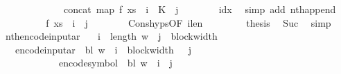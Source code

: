 \begin{isabellebody}
\ \ \ \ \ \ \ \ \ \ \ \ {\isacharequal}{\kern0pt}\ concat\ {\isacharparenleft}{\kern0pt}map\ f\ xs{\isacharparenright}{\kern0pt}\ {\isacharbang}{\kern0pt}\ {\isacharparenleft}{\kern0pt}i{\isacharprime}{\kern0pt}\ {\isacharasterisk}{\kern0pt}\ K\ {\isacharplus}{\kern0pt}\ j{\isacharparenright}{\kern0pt}{\isachardoublequoteclose}\isanewline
\ \ \ \ \ \ \isamarkupfalse%
\ idx\ \isamarkupfalse%
\ {\isacharparenleft}{\kern0pt}simp\ add{\isacharcolon}{\kern0pt}\ nth{\isacharunderscore}{\kern0pt}append{\isacharparenright}{\kern0pt}\isanewline
\ \ \ \ \isamarkupfalse%
\ \isamarkupfalse%
\ {\isachardoublequoteopen}{\isasymdots}\ {\isacharequal}{\kern0pt}\ f\ {\isacharparenleft}{\kern0pt}xs\ {\isacharbang}{\kern0pt}\ i{\isacharprime}{\kern0pt}{\isacharparenright}{\kern0pt}\ {\isacharbang}{\kern0pt}\ j{\isachardoublequoteclose}\isanewline
\ \ \ \ \ \ \isamarkupfalse%
\ Cons{\isachardot}{\kern0pt}hyps{\isacharbrackleft}{\kern0pt}OF\ i{\isacharprime}{\kern0pt}len{\isacharbrackright}{\kern0pt}\ \isakeywordONE{{\isachardot}{\kern0pt}}\isamarkupfalse%
\isanewline
\ \ \ \ \isamarkupfalse%
\ \isamarkupfalse%
\ {\isacharquery}{\kern0pt}thesis\ \isamarkupfalse%
\ Suc\ \isamarkupfalse%
\ simp\isanewline
\ \ \isamarkupfalse%
\isanewline
{}\isamarkupfalse%
%
\endisatagproof
{\isafoldproof}%
%
\isadelimproof
\isanewline
%
\endisadelimproof
\isanewline
{}\isamarkupfalse%
\ nth{\isacharunderscore}{\kern0pt}encode{\isacharunderscore}{\kern0pt}input{\isacharunderscore}{\kern0pt}ar{\isacharcolon}{\kern0pt}\isanewline
\ \ \ {\isachardoublequoteopen}i\ {\isacharless}{\kern0pt}\ length\ w{\isachardoublequoteclose}\ \ {\isachardoublequoteopen}j\ {\isacharless}{\kern0pt}\ block{\isacharunderscore}{\kern0pt}width\ {\isasymGamma}{\isachardoublequoteclose}\isanewline
\ \ \ {\isachardoublequoteopen}encode{\isacharunderscore}{\kern0pt}input{\isacharunderscore}{\kern0pt}ar\ {\isasymGamma}\ bl\ w\ {\isacharbang}{\kern0pt}\ {\isacharparenleft}{\kern0pt}i\ {\isacharasterisk}{\kern0pt}\ block{\isacharunderscore}{\kern0pt}width\ {\isasymGamma}\ {\isacharplus}{\kern0pt}\ j{\isacharparenright}{\kern0pt}\isanewline
\ \ \ \ \ \ \ \ \ \ \ {\isacharequal}{\kern0pt}\ encode{\isacharunderscore}{\kern0pt}symbol\ {\isasymGamma}\ bl\ {\isacharparenleft}{\kern0pt}w\ {\isacharbang}{\kern0pt}\ i{\isacharparenright}{\kern0pt}\ {\isacharbang}{\kern0pt}\ j{\isachardoublequoteclose}\isanewline

\end{isabellebody}
